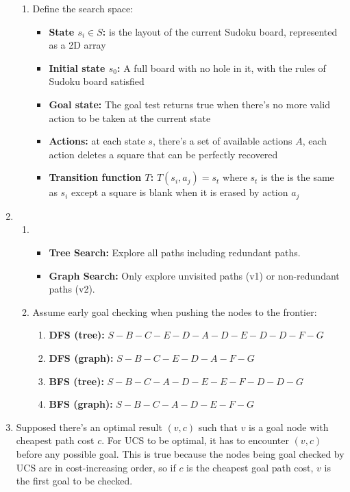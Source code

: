 \documentclass{article}
\begin{document}
\begin{enumerate}[leftmargin=\labelsep]
\begin{enumerate}[leftmargin=\labelsep]
    \item Define the search space:
    \begin{itemize}
      \item \textbf{State $s_i \in S$:} is the layout of the current Sudoku board, represented as a 2D array
      \item \textbf{Initial state $s_0$:} A full board with no hole in it, with the rules of Sudoku board satisfied
      \item \textbf{Goal state:} The goal test returns true when there's no more valid action to be taken at the current state
      \item \textbf{Actions:} at each state $s$, there's a set of available actions $A$, each action deletes a square that can be perfectly recovered
      \item \textbf{Transition function $T$:} $T(s_i, a_j) = s_t$ where $s_t$ is the is the same as $s_i$ except a square is blank when it is erased by action $a_j$
    \end{itemize}
  \end{enumerate}
  \item
    \begin{enumerate}
      \item 
      \begin{itemize}
        \item \textbf{Tree Search:} Explore all paths including redundant paths.
        \item \textbf{Graph Search:} Only explore unvisited paths (v1) or non-redundant paths (v2). 
      \end{itemize}
      \item Assume early goal checking when pushing the nodes to the frontier:
      \begin{enumerate}
        \item \textbf{DFS (tree):} $S-B-C-E-D-A-D-E-D-D-F-G$
        \item \textbf{DFS (graph):} $S-B-C-E-D-A-F-G$
        \item \textbf{BFS (tree):} $S-B-C-A-D-E-E-F-D-D-G$
        \item \textbf{BFS (graph):} $S-B-C-A-D-E-F-G$
      \end{enumerate}
    \end{enumerate}
  \item Supposed there's an optimal result $(v, c)$ such that $v$ is a goal node with cheapest path cost $c$. For UCS to be optimal, it has to encounter $(v, c)$ before any possible goal. This is true because the nodes being goal checked by UCS are in cost-increasing order, so if $c$ is the cheapest goal path cost, $v$ is the first goal to be checked. \\

\end{enumerate}
\end{document}
